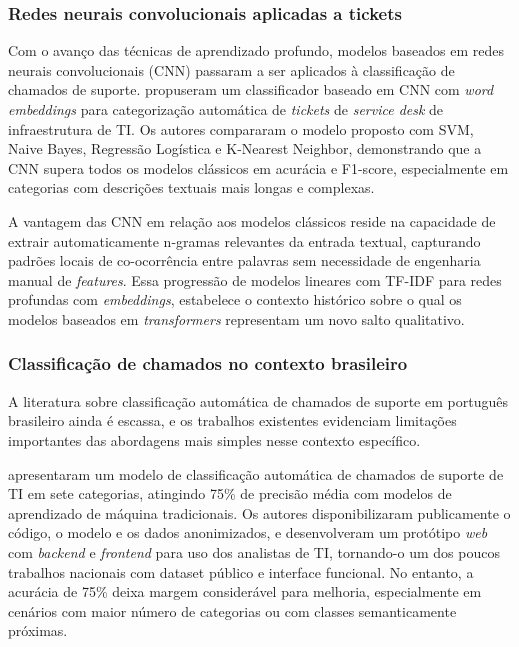 \documentclass[
    12pt,                %
    openright,           %
    oneside,             %
    a4paper,             %
    english,             %
    brazil               %
]{abntex2}
\begin{document}
\subsubsection{Redes neurais convolucionais aplicadas a tickets}
\label{subsubsec:helpdesk_cnn}

Com o avanço das técnicas de aprendizado profundo, modelos baseados em redes neurais convolucionais (CNN) passaram a ser aplicados à classificação de chamados de suporte.  propuseram um classificador baseado em CNN com \textit{word embeddings} para categorização automática de \textit{tickets} de \textit{service desk} de infraestrutura de TI. Os autores compararam o modelo proposto com SVM, Naive Bayes, Regressão Logística e K-Nearest Neighbor, demonstrando que a CNN supera todos os modelos clássicos em acurácia e F1-score, especialmente em categorias com descrições textuais mais longas e complexas.

A vantagem das CNN em relação aos modelos clássicos reside na capacidade de extrair automaticamente n-gramas relevantes da entrada textual, capturando padrões locais de co-ocorrência entre palavras sem necessidade de engenharia manual de \textit{features}. Essa progressão de modelos lineares com TF-IDF para redes profundas com \textit{embeddings}, estabelece o contexto histórico sobre o qual os modelos baseados em \textit{transformers} representam um novo salto qualitativo.

\subsubsection{Classificação de chamados no contexto brasileiro}
\label{subsubsec:helpdesk_brasil}

A literatura sobre classificação automática de chamados de suporte em português brasileiro ainda é escassa, e os trabalhos existentes evidenciam limitações importantes das abordagens mais simples nesse contexto específico.

 apresentaram um modelo de classificação automática de chamados de suporte de TI em sete categorias, atingindo 75\% de precisão média com modelos de aprendizado de máquina tradicionais. Os autores disponibilizaram publicamente o código, o modelo e os dados anonimizados, e desenvolveram um protótipo \textit{web} com \textit{backend} e \textit{frontend} para uso dos analistas de TI, tornando-o um dos poucos trabalhos nacionais com dataset público e interface funcional. No entanto, a acurácia de 75\% deixa margem considerável para melhoria, especialmente em cenários com maior número de categorias ou com classes semanticamente próximas.
\end{document}
